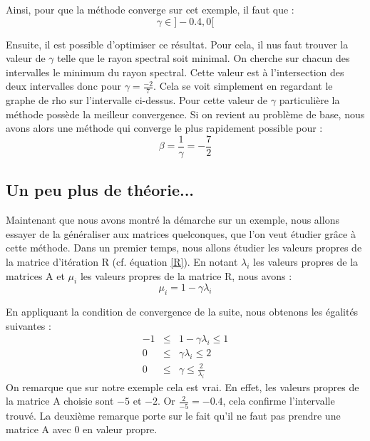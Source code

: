 Ainsi, pour que la méthode converge sur cet exemple, il faut que : 
\begin{equation}
\gamma \in ] -0.4, 0[
\end{equation}

Ensuite, il est possible d'optimiser ce résultat. Pour cela, il nus faut trouver la valeur de $\gamma$ telle que le rayon spectral soit minimal. On cherche sur chacun des intervalles le minimum du rayon spectral. Cette valeur est à l'intersection des deux intervalles donc pour $\gamma = \frac{-2}{7}$. Cela se voit simplement en regardant le graphe de rho sur l'intervalle ci-dessus. Pour cette valeur de $\gamma$ particulière la méthode possède la meilleur convergence. Si on revient au problème de base, nous avons alors une méthode qui converge le plus rapidement possible pour : 
\begin{equation}
\beta = \frac{1}{\gamma} = - \frac{7}{2}
\end{equation}

\subsection{Un peu plus de théorie...}
Maintenant que nous avons montré la démarche sur un exemple, nous allons essayer de la généraliser aux matrices quelconques, que l'on veut étudier grâce à cette méthode. Dans un premier temps, nous allons étudier les valeurs propres de la matrice d'itération R (cf. équation \ref{R}). En notant $\lambda_i$ les valeurs propres de la matrices A et $\mu_i$ les valeurs propres de la matrice R, nous avons : 
\begin{equation}
	\mu_i = 1 - \gamma\lambda_i
\end{equation}

En appliquant la condition de convergence de la suite, nous obtenons les égalités suivantes : 
\begin{eqnarray}
-1 &\leq& 1 - \gamma \lambda_i \leq 1\\
0 &\leq& \gamma \lambda_i \leq 2\\
0 &\leq& \gamma \leq \frac{2}{\lambda_i}
\end{eqnarray}
On remarque que sur notre exemple cela est vrai. En effet, les valeurs propres de la matrice A choisie sont $-5$ et $-2$. Or $\frac{2}{-5} = -0.4$, cela confirme l'intervalle trouvé. La deuxième remarque porte sur le fait qu'il ne faut pas prendre une matrice A avec 0 en valeur propre.\\

